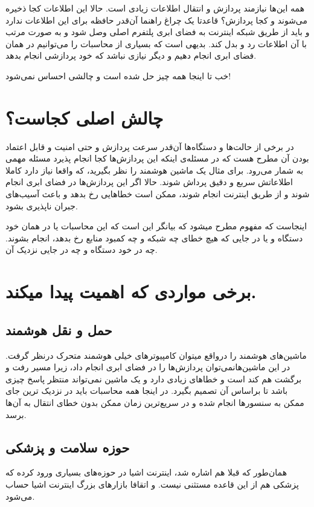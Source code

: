 همه این‌ها نیازمند پردازش و انتقال اطلاعات زیادی است.
حالا این اطلاعات کجا ذخیره می‌شوند و کجا پردازش؟
قاعدتا یک چراغ راهنما آن‌قدر حافظه برای این اطلاعات ندارد و باید از طریق شبکه اینترنت به فضای ابری پلتفرم اصلی وصل شود و به صورت مرتب با آن اطلاعات رد و بدل کند.
بدیهی است که بسیاری از محاسبات را می‌توانیم در همان فضای ابری انجام دهیم و دیگر نیازی نباشد که خود  پردازشی انجام بدهد.

خب تا اینجا همه چیز حل شده است و چالشی احساس نمی‌شود!

\section{چالش اصلی کجاست؟}
در برخی از حالت‌ها و دستگاه‌ها آن‌قدر سرعت پردازش و حتی امنیت و قابل اعتماد بودن آن مطرح هست که در مسئله‌ی اینکه این پردازش‌ها کجا انجام پذیرد مسئله مهمی به شمار می‌رود.
برای مثال یک ماشین هوشمند را نظر بگیرید، که واقعا نیاز دارد کاملا اطلاعاتش سربع و دقیق پرداش شوند. حالا اگر این پردازش‌ها در فضای ابری انجام شوند و از طریق اینترنت انجام شوند، ممکن است خطاهایی رخ بدهد و باعث آسیب‌های جبران ناپذیری بشود.

اینجاست که مفهوم  مطرح میشود که بیانگر این است که این محاسبات یا در همان خود دستگاه و یا در جایی که هیچ خطای چه شبکه و چه کمبود منابع رخ بدهد، انجام بشوند.
چه در خود دستگاه و چه در جایی نزدیک آن.

\section{برخی مواردی که  اهمیت پیدا میکند.}
\subsection{حمل و نقل هوشمند}
ماشین‌های هوشمند را درواقع میتوان کامپیوترهای خیلی هوشمند متحرک درنظر گرفت.
در این ماشین‌هانمی‌توان پردازش‌ها را در فضای ابری انجام داد، زیرا مسیر رفت و برگشت هم کند است و خطاهای زیادی دارد و یک ماشین نمی‌تواند منتظر پاسخ چیزی باشد تا براساس آن تصمیم بگیرد.
در اینجا همه محاسبات باید در نزدیک ترین جای ممکن به سنسورها انجام شده و در سریع‌ترین زمان ممکن بدون خطای انتقال به آن‌ها برسد.
\subsection{حوزه سلامت و پزشکی}
همان‌طور که قبلا هم اشاره شد، اینترنت اشیا در حوزه‌های بسیاری ورود کرده که پزشکی هم از این قاعده مستثنی نیست.
و اتقافا بازارهای بزرگ اینترنت اشیا حساب می‌شود.

